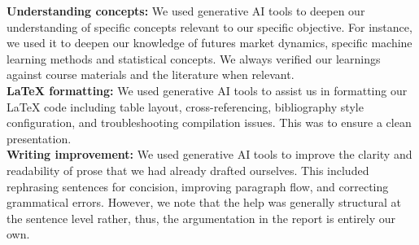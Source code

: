\documentclass[pdflatex,sn-mathphys-num, oneside, 11pt]{sn-jnl}%
\theoremstyle{thmstyleone}%
\theoremstyle{thmstyletwo}%
\theoremstyle{thmstylethree}%
\begin{document}
\textbf{Understanding concepts:} We used generative AI tools to deepen our understanding of specific concepts relevant to our specific objective. For instance, we used it to deepen our knowledge of futures market dynamics, specific machine learning methods and statistical concepts. We always verified our learnings against course materials and the literature when relevant.\\

\textbf{LaTeX formatting:} We used generative AI tools to assist us in formatting our LaTeX code including table layout, cross-referencing, bibliography style configuration, and troubleshooting compilation issues. This was to ensure a clean presentation.\\

\textbf{Writing improvement:} We used generative AI tools to improve the clarity and readability of prose that we had already drafted ourselves. This included rephrasing sentences for concision, improving paragraph flow, and correcting grammatical errors. However, we note that the help was generally structural at the sentence level rather, thus, the argumentation in the report is entirely our own.\\

\clearpage
\end{document}
